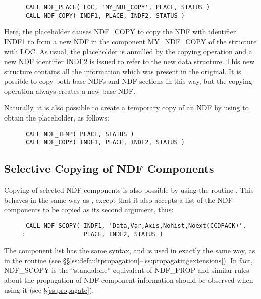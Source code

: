 \small
\begin{verbatim}
      CALL NDF_PLACE( LOC, 'MY_NDF_COPY', PLACE, STATUS )
      CALL NDF_COPY( INDF1, PLACE, INDF2, STATUS )
\end{verbatim}
\normalsize

Here, the placeholder causes NDF\_COPY to copy the NDF with identifier
INDF1 to form a new NDF in the component MY\_NDF\_COPY of the
 structure with
 LOC.
As usual, the placeholder is annulled by the copying operation and a new NDF 
identifier INDF2 is issued to refer to the new data structure.
This new structure contains all the information which was present in the 
original.
It is possible to copy both base NDFs and NDF sections in this way, but the
copying operation always creates a new base NDF. 

Naturally, it is also possible to create a temporary copy of an NDF by using
 to obtain the placeholder, as follows:

\small
\begin{verbatim}
      CALL NDF_TEMP( PLACE, STATUS )
      CALL NDF_COPY( INDF1, PLACE, INDF2, STATUS )
\end{verbatim}
\normalsize

\subsection{\label{ss:selectivecopy}Selective Copying of NDF Components}

Copying of selected NDF components is also possible by using the
routine . This behaves in the same way as , except
that it also accepts a list of the NDF components to be copied as its
second argument, thus:

\small
\begin{verbatim}
      CALL NDF_SCOPY( INDF1, 'Data,Var,Axis,Nohist,Noext(CCDPACK)',
     :                PLACE, INDF2, STATUS )
\end{verbatim}
\normalsize

The component list has the same syntax, and is used in exactly the same
way, as in the routine  (see
\S\S\ref{ss:defaultpropagation}--\ref{ss:propagatingextensions}). In
fact, NDF\_SCOPY is the ``standalone'' equivalent of NDF\_PROP and
similar rules about the propagation of NDF component information
should be observed when using it (see \S\ref{ss:propagate}).

